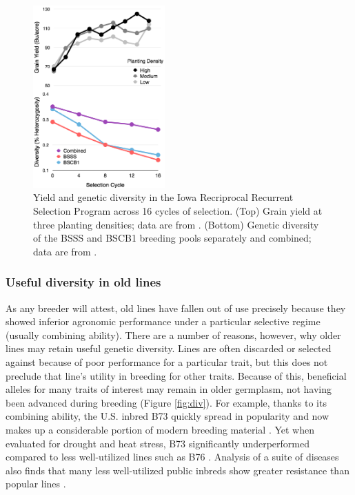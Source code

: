 \documentclass[12pt]{article}
\begin{document}
\begin{figure}
    \includegraphics[width=0.45\textwidth]{BSSS.png}
  \caption{Yield and genetic diversity in the Iowa Recriprocal Recurrent Selection Program across 16 cycles of selection. (Top) Grain yield at three planting densities; data are from \citet{rouse2003selection}. (Bottom) Genetic diversity of the BSSS and BSCB1 breeding pools separately and combined; data are from \citet{Gerke:2013tw}.}
\label{fig:trends}
\end{figure}

\subsubsection*{Useful diversity in old lines}
As any breeder will attest, old lines have fallen out of use precisely because they showed inferior agronomic performance under a particular selective regime (usually combining ability).
There are a number of reasons, however, why older lines may retain useful genetic diversity.
Lines are often discarded or selected against because of poor performance for a particular trait, but this does not preclude that line's utility in breeding for other traits.
Because of this, beneficial alleles for many traits of interest may remain in older germplasm, not having been advanced during breeding (Figure \ref{fig:div}).
For example, thanks to its combining ability, the U.S. inbred B73 quickly spread in popularity and now makes up a considerable portion of modern breeding material \citep{van2012historical}. 
Yet when evaluated for drought and heat stress, B73 significantly underperformed compared to less well-utilized lines such as B76 \citep{chen2012characterization}.
Analysis of a suite of diseases also finds that many less well-utilized public inbreds show greater resistance than popular lines \citep{wisser2011multivariate}. 
\end{document}
